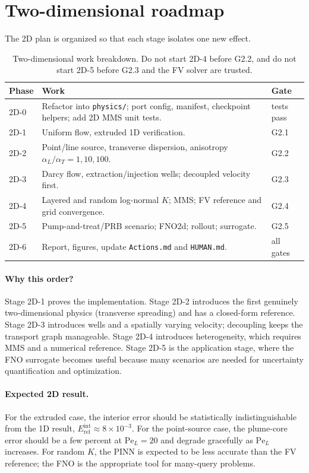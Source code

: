 \documentclass[11pt]{article}
\newcommand{\Pe}{\mathrm{Pe}}
\newcommand{\tabhead}[1]{\textbf{#1}}
\begin{document}
\section{Two-dimensional roadmap}
\label{sec:2d}

The 2D plan is organized so that each stage isolates one new effect.

\begin{table}[htbp]
\centering
\small
\begin{tabularx}{\textwidth}{@{}lYl@{}}
\toprule
\tabhead{Phase} & \tabhead{Work} & \tabhead{Gate}\\
\midrule
2D-0 & Refactor into \texttt{physics/}; port config, manifest, checkpoint
       helpers; add 2D MMS unit tests. & tests pass\\
2D-1 & Uniform flow, extruded 1D verification. & G2.1\\
2D-2 & Point/line source, transverse dispersion, anisotropy
       $\alpha_L/\alpha_T=1,10,100$. & G2.2\\
2D-3 & Darcy flow, extraction/injection wells; decoupled velocity first. & G2.3\\
2D-4 & Layered and random log-normal $K$; MMS; FV reference and grid
       convergence. & G2.4\\
2D-5 & Pump-and-treat/PRB scenario; FNO2d; rollout; surrogate. & G2.5\\
2D-6 & Report, figures, update \texttt{Actions.md} and \texttt{HUMAN.md}. & all gates\\
\bottomrule
\end{tabularx}
\caption{Two-dimensional work breakdown.  Do not start 2D-4 before G2.2, and do
not start 2D-5 before G2.3 and the FV solver are trusted.}
\label{tab:2d}
\end{table}

\paragraph{Why this order?}
Stage 2D-1 proves the implementation.  Stage 2D-2 introduces the first genuinely
two-dimensional physics (transverse spreading) and has a closed-form reference.
Stage 2D-3 introduces wells and a spatially varying velocity; decoupling keeps
the transport graph manageable.  Stage 2D-4 introduces heterogeneity, which
requires MMS and a numerical reference.  Stage 2D-5 is the application stage,
where the FNO surrogate becomes useful because many scenarios are needed for
uncertainty quantification and optimization.

\paragraph{Expected 2D result.}
For the extruded case, the interior error should be statistically
indistinguishable from the 1D result, $E_{\mathrm{rel}}^{\mathrm{int}}
\approx 8\times10^{-3}$.  For the point-source case, the plume-core error
should be a few percent at $\Pe_L=20$ and degrade gracefully as $\Pe_L$
increases.  For random $K$, the PINN is expected to be less accurate than the
FV reference; the FNO is the appropriate tool for many-query problems.
\end{document}

